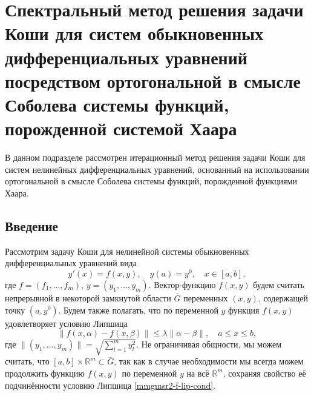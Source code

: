 \section{Спектральный метод решения задачи Коши для систем обыкновенных дифференциальных уравнений посредством  ортогональной в смысле Соболева системы функций, порожденной системой Хаара}

В данном подразделе рассмотрен итерационный метод решения задачи Коши для систем нелинейных дифференциальных уравнений, основанный на использовании ортогональной в смысле Соболева системы функций, порожденной функциями Хаара.

\subsection{Введение}
\label{mmgmsr2-intro}

Рассмотрим задачу Коши для нелинейной системы обыкновенных дифференциальных уравнений вида
\begin{equation}\label{mmgmsr2-cauchy-problem}
y'(x)=f(x,y), \quad y(a)=y^0, \quad x \in [a,b],
\end{equation}
где $f=(f_1, \ldots, f_m)$, $y=(y_1, \ldots, y_m)$. %
Вектор-функцию $f(x,y)$ будем считать непрерывной в некоторой замкнутой  области $\bar G$ переменных $(x,y)$, содержащей точку $(a,y^0)$.
Будем также полагать, что по переменной $y$ функция $f(x,y)$ удовлетворяет условию Липшица
\begin{equation}\label{mmgmsr2-f-lip-cond}
\|f(x,\alpha)-f(x,\beta)\|\le \lambda\|\alpha-\beta\|,
\quad a \le x \le b,
\end{equation}
где $\|(y_1,\ldots,y_m)\|=\sqrt{\sum_{l=1}^my_l^2}$.
Не ограничивая общности, мы можем считать, что  $[a,b] \times \mathbb{R}^m \subset \bar G$, так как в случае необходимости мы всегда можем продолжить функцию $f(x,y)$ по переменной $y$ на всё $\mathbb{R}^m$, сохраняя свойство её подчинённости условию Липшица \eqref{mmgmsr2-f-lip-cond}.

